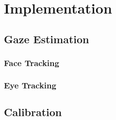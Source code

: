\chapter{Implementation}

\section{Gaze Estimation}
\subsection{Face Tracking}
\subsection{Eye Tracking}

\section{Calibration}
